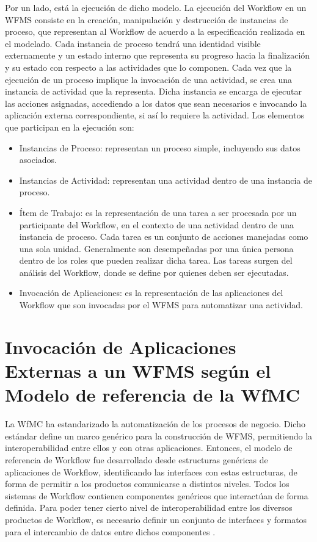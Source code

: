 Por un lado, está la ejecución de dicho modelo. La ejecución del Workflow en un WFMS consiste en la creación, manipulación y destrucción de instancias de proceso, que representan al Workflow de acuerdo a la especificación realizada en el modelado. Cada instancia de proceso tendrá una identidad visible externamente y un estado interno que representa su progreso hacia la finalización y su estado con respecto a las actividades que lo componen. Cada vez que la ejecución de un proceso implique la invocación de una actividad, se crea una instancia de actividad que la representa. Dicha instancia se encarga de ejecutar las acciones asignadas, accediendo a los datos que sean necesarios e invocando la aplicación externa correspondiente, si así lo requiere la actividad. Los elementos que participan en la ejecución son:

\begin{itemize}
	\item Instancias de Proceso: representan un proceso simple, incluyendo sus datos asociados.
	
	\item Instancias de Actividad: representan una actividad dentro de una instancia de proceso.
	
	\item Ítem de Trabajo: es la representación de una tarea a ser procesada por un participante del Workflow, en el contexto de una actividad dentro de una instancia de proceso. Cada tarea es un conjunto de acciones manejadas como una sola unidad. Generalmente son desempeñadas por una única persona dentro de los roles que pueden realizar dicha tarea. Las tareas surgen del análisis del Workflow, donde se define por quienes deben ser ejecutadas.
	
	\item Invocación de Aplicaciones: es la representación de las aplicaciones del Workflow que son invocadas por el WFMS para automatizar una actividad.
\end{itemize}

\section{Invocación de Aplicaciones Externas a un WFMS según el Modelo de referencia de la WfMC}
\label{Invocación de Aplicaciones Externas a un WFMS según el Modelo de referencia de la WfMC}

La WfMC ha estandarizado la automatización de los procesos de negocio. Dicho estándar define un marco genérico para la construcción de WFMS, permitiendo la interoperabilidad entre ellos y con otras aplicaciones. Entonces, el modelo de referencia de Workflow fue desarrollado desde estructuras genéricas de aplicaciones de Workflow, identificando las interfaces con estas estructuras, de forma de permitir a los productos comunicarse a distintos niveles. Todos los sistemas de Workflow contienen componentes genéricos que interactúan de forma definida. Para poder tener cierto nivel de interoperabilidad entre los diversos productos de Workflow, es necesario definir un conjunto de interfaces y formatos para el intercambio de datos entre dichos componentes \cite{WfMC09}.\\

